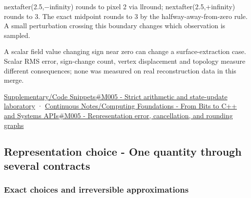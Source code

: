 nextafter(2.5,−infinity) rounds to pixel 2 via llround; nextafter(2.5,+infinity) rounds to 3. The exact midpoint rounds to 3 by the halfway-away-from-zero rule. A small perturbation crossing this boundary changes which observation is sampled.

A scalar field value changing sign near zero can change a surface-extraction case. Scalar RMS error, sign-change count, vertex displacement and topology measure different consequences; none was measured on real reconstruction data in this merge.

\hyperref[appendix-4e2236f53445-m005---strict-arithmetic-and-state-update-laboratory]{Supplementary/Code Snippets\#M005 - Strict arithmetic and state-update laboratory} · \hyperref[01-foundations-i-ch011-m005---representation-error-cancellation-and-rounding-graphs]{Continuous Notes/Computing Foundations - From Bits to C++ and Systems APIs\#M005 - Representation error, cancellation, and rounding graphs}

\subsection{Representation choice - One quantity through several contracts}\label{appendix-92ff77d4dfdc-representation-choice---one-quantity-through-several-contracts}

\subsubsection{Exact choices and irreversible approximations}\label{appendix-92ff77d4dfdc-exact-choices-and-irreversible-approximations}

